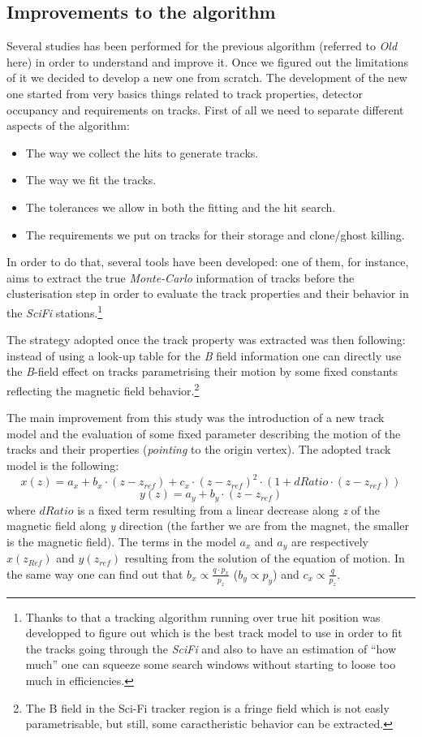 \documentclass[paper=a4, fontsize=10pt]{scrartcl}
\numberwithin{equation}{section}		%
\numberwithin{figure}{section}			%
\numberwithin{table}{section}				%
\begin{document}
\subsection{Improvements to the algorithm}
Several studies has been performed for the previous algorithm (referred to \textit{Old} here) in order to understand and improve it. Once we figured out the limitations of it we decided to develop a new one from scratch. The development of the new one started from very basics things related to track properties, detector occupancy and requirements on tracks.
First of all we need to separate different aspects of the algorithm: 

\begin{itemize}
\item{The way we collect the hits to generate tracks.}
\item{The way we fit the tracks.}
\item{The tolerances we allow in both the fitting and the hit search.}
\item{The requirements we put on tracks for their storage and clone/ghost killing.}
\end{itemize}

In order to do that, several tools have been developed: one of them, for instance, aims to extract the true \textit{Monte-Carlo} information of tracks before the clusterisation step in order to evaluate the track properties and their behavior in the \textit{SciFi} stations.\footnote{Thanks to that a tracking algorithm running over true hit position was developped to figure out which is the best track model to use in order to fit the tracks going through the \textit{SciFi} and also to have an estimation of ``how much'' one can squeeze some search windows without starting to loose too much in efficiencies.} 

The strategy adopted once the track property was extracted was then following: instead of using a look-up table for the \textit{B} field information one can directly use the \textit{B}-field effect on tracks parametrising their motion by some fixed constants reflecting the magnetic field behavior.\footnote{The B field in the Sci-Fi tracker region is a fringe field which is not easly parametrisable, but still, some caractheristic behavior can be extracted.}

The main improvement from this study was the introduction of a new track model and the evaluation of some fixed parameter describing the motion of the tracks and their properties (\textit{pointing} to the origin vertex).
The adopted track model is the following:
$$x(z) = a_x + b_x \cdot (z-z_{ref}) + c_x \cdot (z-z_{ref})^{2}\cdot(1+dRatio \cdot (z-z_{ref}))$$ $$y(z) = a_y + b_y \cdot (z-z_{ref})$$
where $dRatio$ is a fixed term resulting from a linear decrease along \textit{z} of the magnetic field along \textit{y} direction (the farther we are from the magnet, the smaller is the magnetic field). The terms in the model $a_{x}$ and $a_{y}$ are respectively $x(z_{Ref})$ and $y(z_{ref})$ resulting from the solution of the equation of motion. In the same way one can find out that $b_{x}\propto \frac{q \cdot p_x}{p_z}$ ($b_{y}\propto p_y$) and $c_{x}\propto \frac{q}{p_z}$.
\end{document}
